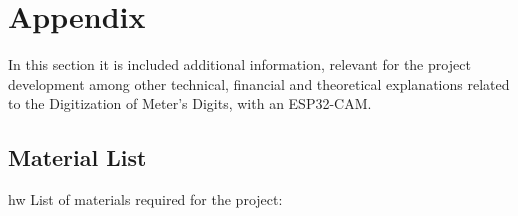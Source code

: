 %
%
%
%

\chapter{Appendix}

In this section it is included additional information, relevant for the project development among other technical, financial and theoretical explanations related to the Digitization of Meter's Digits, with an ESP32-CAM.
  
\bigskip

\section{Material List}
\ac{hw} List of materials required for the project:
